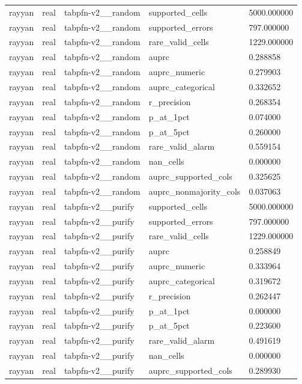 \begin{tabular}{lllll}
rayyan & real & tabpfn-v2\_\_random & supported\_cells & 5000.000000 \\
rayyan & real & tabpfn-v2\_\_random & supported\_errors & 797.000000 \\
rayyan & real & tabpfn-v2\_\_random & rare\_valid\_cells & 1229.000000 \\
rayyan & real & tabpfn-v2\_\_random & auprc & 0.288858 \\
rayyan & real & tabpfn-v2\_\_random & auprc\_numeric & 0.279903 \\
rayyan & real & tabpfn-v2\_\_random & auprc\_categorical & 0.332652 \\
rayyan & real & tabpfn-v2\_\_random & r\_precision & 0.268354 \\
rayyan & real & tabpfn-v2\_\_random & p\_at\_1pct & 0.074000 \\
rayyan & real & tabpfn-v2\_\_random & p\_at\_5pct & 0.260000 \\
rayyan & real & tabpfn-v2\_\_random & rare\_valid\_alarm & 0.559154 \\
rayyan & real & tabpfn-v2\_\_random & nan\_cells & 0.000000 \\
rayyan & real & tabpfn-v2\_\_random & auprc\_supported\_cols & 0.325625 \\
rayyan & real & tabpfn-v2\_\_random & auprc\_nonmajority\_cols & 0.037063 \\
rayyan & real & tabpfn-v2\_\_purify & supported\_cells & 5000.000000 \\
rayyan & real & tabpfn-v2\_\_purify & supported\_errors & 797.000000 \\
rayyan & real & tabpfn-v2\_\_purify & rare\_valid\_cells & 1229.000000 \\
rayyan & real & tabpfn-v2\_\_purify & auprc & 0.258849 \\
rayyan & real & tabpfn-v2\_\_purify & auprc\_numeric & 0.333964 \\
rayyan & real & tabpfn-v2\_\_purify & auprc\_categorical & 0.319672 \\
rayyan & real & tabpfn-v2\_\_purify & r\_precision & 0.262447 \\
rayyan & real & tabpfn-v2\_\_purify & p\_at\_1pct & 0.000000 \\
rayyan & real & tabpfn-v2\_\_purify & p\_at\_5pct & 0.223600 \\
rayyan & real & tabpfn-v2\_\_purify & rare\_valid\_alarm & 0.491619 \\
rayyan & real & tabpfn-v2\_\_purify & nan\_cells & 0.000000 \\
rayyan & real & tabpfn-v2\_\_purify & auprc\_supported\_cols & 0.289930 \\

\end{tabular}
